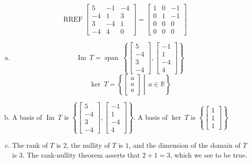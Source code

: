 \begin{exerciseAnswer} 


\[\operatorname{RREF} \left[\begin{array}{ccc}
5 & -1 & -4 \\
-4 & 1 & 3 \\
3 & -4 & 1 \\
-4 & 4 & 0
\end{array}\right] = \left[\begin{array}{ccc}
1 & 0 & -1 \\
0 & 1 & -1 \\
0 & 0 & 0 \\
0 & 0 & 0
\end{array}\right] \]


\begin{enumerate}[(a)]
\item \[\operatorname{Im}\ T = \operatorname{span}\  \left\{ \left[\begin{array}{c}
5 \\
-4 \\
3 \\
-4
\end{array}\right] , \left[\begin{array}{c}
-1 \\
1 \\
-4 \\
4
\end{array}\right] \right\} \]\[\operatorname{ker}\ T =  \left\{ \left[\begin{array}{c}
a \\
a \\
a
\end{array}\right] \middle|\,a\in\mathbb{R}\right\} \]
\item  A basis of \(\operatorname{Im}\ T\) is \( \left\{ \left[\begin{array}{c}
5 \\
-4 \\
3 \\
-4
\end{array}\right] , \left[\begin{array}{c}
-1 \\
1 \\
-4 \\
4
\end{array}\right] \right\} \). A basis of \(\operatorname{ker}\ T\) is \( \left\{ \left[\begin{array}{c}
1 \\
1 \\
1
\end{array}\right] \right\} \)
\item  The rank of \(T\) is \( 2 \), the nullity of \(T\) is \( 1 \), and the dimension of the domain of \(T\) is \( 3 \). The rank-nullity theorem asserts that \( 2 + 1 = 3 \), which we see to be true. 
\end{enumerate}
    
\end{exerciseAnswer}
    
